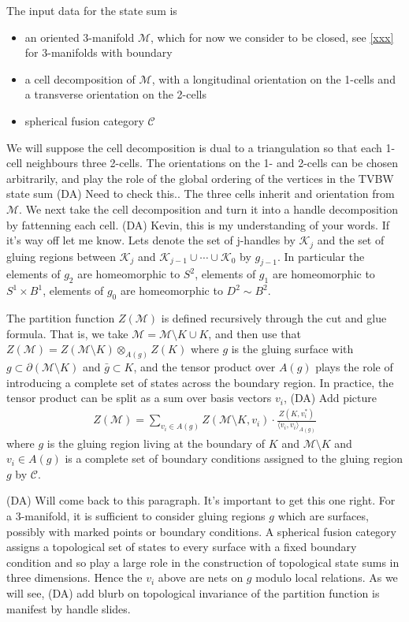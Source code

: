 \documentclass[12pt,a4paper]{article}
\newcommand{\tp}{\otimes}
\newcommand{\mcc}{\mathcal{C}}
\newcommand{\mck}{\mathcal{K}}
\newcommand{\mcm}{\mathcal{M}}
\newcommand{\dave}[1]{{\color{ao(english)}\footnotesize{(DA) #1}}}
\begin{document}
The input data for the state sum is
\begin{itemize}
\item an oriented 3-manifold $\mcm$, which for now we consider to be closed, see \ref{xxx} for 3-manifolds with boundary
\item a cell decomposition of $\mcm$, with a longitudinal orientation on the 1-cells and a transverse orientation on the 2-cells
\item spherical fusion category $\mcc$ 
\end{itemize}
We will suppose the cell decomposition is dual to a triangulation so that each 1-cell neighbours three 2-cells.
The orientations on the 1- and 2-cells can be chosen arbitrarily, 
and play the role of the global ordering of the vertices in the TVBW state sum 
\dave{Need to check this.}. 
The three cells inherit and orientation from $\mcm$.
We next take the cell decomposition and turn it into a handle decomposition by fattenning each cell.
\dave{Kevin, this is my understanding of your words.
If it's way off let me know.}
Lets denote the set of j-handles by $\mck_j$ and the set of gluing regions between $\mck_j$ and $\mck_{j-1} \cup \cdots \cup \mck_{0}$ by $g_{j-1}$. 
In particular the elements of $g_2$ are homeomorphic to $S^2$, 
elements of $g_1$ are homeomorphic to $S^1 \times B^1$,
elements of $g_0$ are homeomorphic to $D^2 \sim B^2$.

The partition function $Z(\mcm)$ is defined recursively through the cut and glue formula.
That is, we take $\mcm = \mcm \setminus K \cup K$, 
and then use that $Z(\mcm) = Z(\mcm \setminus K) \tp_{A(g)} Z(K)$ where $g$ is the gluing surface with $g \subset \partial(\mcm \setminus K)$ and $\bar{g} \subset K$, and the tensor product over $A(g)$ plays the role of introducing a complete set of states across the boundary region.
In practice, the tensor product can be split as a sum over basis vectors $v_i$,
\dave{Add picture}
\begin{align}
Z(\mcm) = \sum_{v_i \in A(g)} Z(\mcm \setminus K, v_i) \cdot \frac{Z(K, v_i^*) }{\langle v_i, v_i \rangle_{A(g)}}
\label{gluing_formula}
\end{align}
where $g$ is the gluing region living at the boundary of $K$ and $\mcm \setminus K$ and $v_i \in A(g)$  is a complete set of boundary conditions assigned to the gluing region $g$ by $\mcc$.

\dave{Will come back to this paragraph. 
It's important to get this one right.}
For a 3-manifold, it is sufficient to consider gluing regions $g$ which are surfaces, 
possibly with marked points or boundary conditions. 
A spherical fusion category assigns a topological set of states to every surface with a fixed boundary condition and so play a large role in the construction of topological state sums in three dimensions.
Hence the $v_i$ above are nets on $g$ modulo local relations.
As we will see, 
\dave{add blurb on} topological invariance of the partition function is manifest by handle slides.
\end{document}
